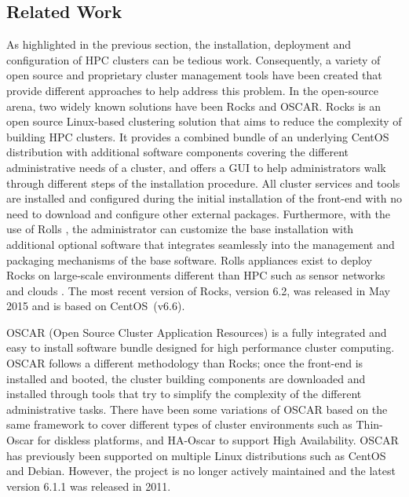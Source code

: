 \subsection{Related Work} \label{sec:related_work}

As highlighted in the previous section, the installation, deployment and
configuration of HPC clusters can be tedious work.  Consequently, a variety of
open source and proprietary cluster management tools have been created that
provide different approaches to help address this problem.  In the open-source
arena, two widely known solutions have been Rocks and OSCAR.  Rocks
\cite{rocks2003,rocks_url} is an open source Linux-based clustering solution
that aims to reduce the complexity of building HPC clusters.  It provides a
combined bundle of an underlying CentOS distribution with additional software
components covering the different administrative needs of a cluster, 
and offers a GUI to help administrators walk through
different steps of the installation procedure.  All cluster services and tools
are installed and configured during the initial installation of the front-end
with no need to download and %
configure other external
packages. Furthermore, with the use of Rolls \cite{rolls2004}, the
administrator can customize the base installation
with additional
optional software that integrates seamlessly
into the management and
packaging mechanisms of the base software.
Rolls appliances exist to deploy Rocks on large-scale environments different 
than HPC such as sensor networks \cite{rolls_sensors2012} and clouds \cite{rolls_cloud2011}.
The most recent version of Rocks, version 6.2, was released in May 2015 and is
based on CentOS~(v6.6).

OSCAR \cite{oscar2001,oscar_url} (Open Source Cluster Application Resources) is
a fully integrated and easy to install software bundle designed for high
performance cluster computing.
OSCAR follows a different methodology than Rocks; once
the front-end is installed and booted, the cluster building components are
downloaded and installed through tools that try to simplify the complexity of
the different administrative tasks.  There have been some variations of OSCAR
based on the same framework to cover different types of cluster environments
such as Thin-Oscar for diskless platforms, and HA-Oscar to support High
Availability. OSCAR has previously been supported on multiple Linux distributions such as
CentOS and Debian. However,
the project is no longer actively maintained and the latest
version 6.1.1 was released in 2011.

